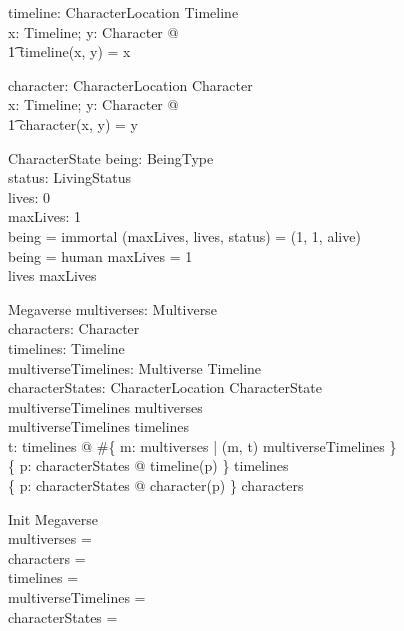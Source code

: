 \documentclass{article}
\begin{document}
\begin{axdef}
timeline: CharacterLocation \fun Timeline \\
\where
\forall x: Timeline; y: Character @ \\
\t1 timeline(x, y) = x \\
\end{axdef}

\begin{axdef}
character: CharacterLocation \fun Character \\
\where
\forall x: Timeline; y: Character @ \\
\t1 character(x, y) = y \\
\end{axdef} 

\begin{schema}{CharacterState}
being: BeingType \\
status: LivingStatus \\
lives: 0   \\ 
maxLives: 1  \\ 
\where
being = immortal \implies (maxLives, lives, status) = (1, 1, alive) \\
being = human \implies maxLives = 1 \\
lives \leq maxLives \\
\end{schema}

\begin{schema}{Megaverse}
multiverses: \power Multiverse \\
characters: \power Character \\
timelines: \power Timeline \\ 
multiverseTimelines: Multiverse \rel Timeline \\
characterStates: CharacterLocation \pfun CharacterState \\
\where
\dom multiverseTimelines \subseteq multiverses \\ 
\ran multiverseTimelines \subseteq timelines \\ 
\forall t: timelines @ \#\{ m: multiverses | (m, t) \in multiverseTimelines \}  \\
\{ p: \dom characterStates @ timeline(p) \} \subseteq timelines \\
\{ p: \dom characterStates @ character(p) \} \subseteq characters \\
\end{schema}

\begin{schema}{Init}
Megaverse \\ 
\where
multiverses = \emptyset \\
characters = \emptyset \\ 
timelines = \emptyset \\
multiverseTimelines = \emptyset \\
characterStates = \emptyset \\
\end{schema}
\end{document}
